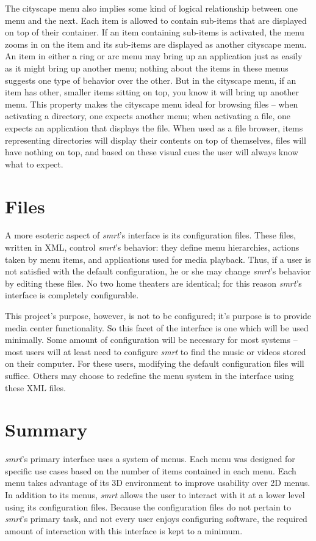 \documentclass[letterpaper, notitlepage, 11pt]{article}
\begin{document}
The cityscape menu also implies some kind of logical relationship between one
menu and the next.  Each item is allowed to contain sub-items that are displayed
on top of their container.  If an item containing sub-items is activated, the
menu zooms in on the item and its sub-items are displayed as another cityscape
menu.  An item in either a ring or arc menu may bring up an application just as
easily as it might bring up another menu; nothing about the items in these menus
suggests one type of behavior over the other.  But in the cityscape menu, if an
item has other, smaller items sitting on top, you know it will bring up another
menu.  This property makes the cityscape menu ideal for browsing files -- when
activating a directory, one expects another menu; when activating a file, one
expects an application that displays the file.  When used as a file browser,
items representing directories will display their contents on top of themselves,
files will have nothing on top, and based on these visual cues the user will
always know what to expect.

\section{Files}
A more esoteric aspect of \textit{smrt}'s interface is its configuration files.
These files, written in XML, control \textit{smrt}'s behavior: they define menu
hierarchies, actions taken by menu items, and applications used for media
playback.  Thus, if a user is not satisfied with the default configuration, he
or she may change \textit{smrt}'s behavior by editing these files.  No two home
theaters are identical; for this reason \textit{smrt}'s interface is completely
configurable.

This project's purpose, however, is not to be configured; it's purpose is to
provide media center functionality.  So this facet of the interface is one which
will be used minimally.  Some amount of configuration will be necessary for most
systems -- most users will at least need to configure \textit{smrt} to find the
music or videos stored on their computer.  For these users, modifying the
default configuration files will suffice.  Others may choose to redefine the menu
system in the interface using these XML files.

\section{Summary}
\textit{smrt}'s primary interface uses a system of menus.  Each menu was
designed for specific use cases based on the number of items contained in
each menu.  Each menu takes advantage of its 3D environment to improve usability
over 2D menus.  In addition to its menus, \textit{smrt} allows the user to
interact with it at a lower level using its configuration files.  Because the
configuration files do not pertain to \textit{smrt}'s primary task, and not
every user enjoys configuring software, the required amount of interaction with
this interface is kept to a minimum.
\end{document}
